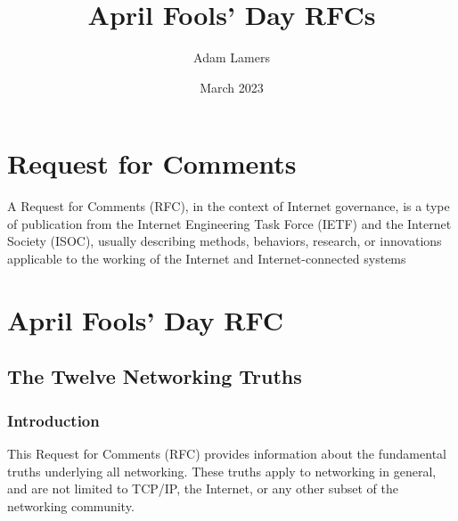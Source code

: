 \documentclass{article}
\title{April Fools' Day RFCs}
\author{Adam Lamers}
\date{March 2023}
\begin{document}
\maketitle
\tableofcontents

\section{Request for Comments}
    A Request for Comments (RFC), in the context of Internet governance, is a type of publication from the Internet Engineering Task Force (IETF) and the Internet Society (ISOC), usually describing methods, behaviors, research, or innovations applicable to the working of the Internet and Internet-connected systems \cite{wikipediaRFC}
\section{April Fools' Day RFC}
\subsection{The Twelve Networking Truths}
\subsubsection{Introduction}

   This Request for Comments (RFC) provides information about the
   fundamental truths underlying all networking. These truths apply to
   networking in general, and are not limited to TCP/IP, the Internet,
   or any other subset of the networking community.
\end{document}

